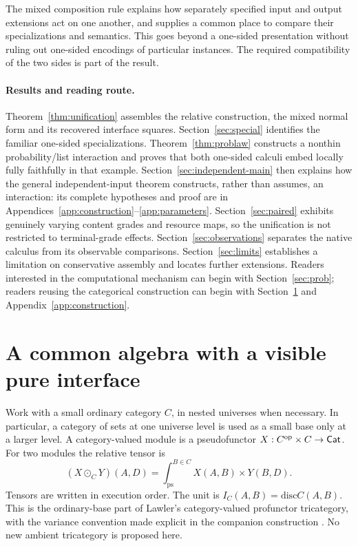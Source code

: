 \documentclass[11pt]{article}
\numberwithin{equation}{section}
\theoremstyle{definition}\newtheorem{definition}[theorem]{Definition}
\newcommand{\Disc}{\mathrm{disc}}\newcommand{\st}{\mathbin{\star}}\newcommand{\di}{\mathbin{\diamond}}\newcommand{\bx}{\mathop{\boxtimes}}
\begin{document}
The mixed composition rule explains how separately specified input and output
extensions act on one another, and supplies a common place to compare their
specializations and semantics. This goes beyond a one-sided presentation
without ruling out one-sided encodings of particular instances. The required
compatibility of the two sides is part of the result.

\paragraph{Results and reading route.}
Theorem~\ref{thm:unification} assembles the relative construction, the mixed
normal form and its recovered interface squares. Section~\ref{sec:special}
identifies the familiar one-sided specializations. Theorem~\ref{thm:problaw}
constructs a nonthin probability/list interaction and proves that both
one-sided calculi embed locally fully faithfully in that example.
Section~\ref{sec:independent-main} then explains how the general
independent-input theorem constructs, rather than assumes, an interaction:
its complete hypotheses and proof are in Appendices~\ref{app:construction}--\ref{app:parameters}.
Section~\ref{sec:paired} exhibits genuinely varying content grades and
resource maps, so the unification is not restricted to terminal-grade effects.
Section~\ref{sec:observations} separates the native calculus from its
observable comparisons. Section~\ref{sec:limits} establishes a limitation
on conservative assembly and locates further extensions. Readers interested
in the computational mechanism can begin with Section~\ref{sec:prob}; readers
reusing the categorical construction can begin with
Section~\ref{sec:relative} and Appendix~\ref{app:construction}.

\section{A common algebra with a visible pure interface}\label{sec:relative}
Work with a small ordinary category $C$, in nested universes when necessary.
In particular, a category of sets at one universe level is used as a small
base only at a larger level. A category-valued module is a pseudofunctor
$X:C^{\mathrm{op}}\times C\to\mathsf{Cat}$. For two modules the relative tensor is
\begin{equation}\label{eq:relative-tensor}
 (X\odot_CY)(A,D)=\int^{B\in C}_{\mathrm{ps}}X(A,B)\times Y(B,D).
\end{equation}
Tensors are written in execution order. The unit is
$I_C(A,B)=\Disc C(A,B)$. This is the ordinary-base part of Lawler's
category-valued profunctor tricategory, with the variance convention made
explicit in the companion construction \cite[Sec.~4.1.1]{Lawler}\cite{U}.
No new ambient tricategory is proposed here.
\end{document}
